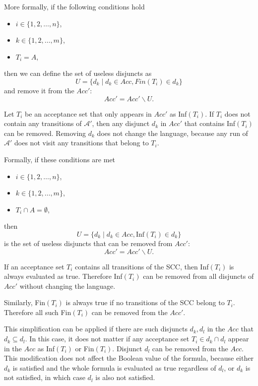 \documentclass[
  digital, %
  twoside, %
  table,   %
  lof,     %
  lot,     %
]{fithesis3}
\begin{document}
More formally, if the following conditions hold
\begin{itemize}
  \item $i \in \{1,2, \dots, n\}$,
  \item $k\in \{1,2, \dots, m\}$,
  \item $T_i = A$,
\end{itemize}
then we can define the set of useless disjuncts as
\begin{equation*}
  U = \{d_k \mid d_k \in Acc, Fin(T_i) \in d_k \}
\end{equation*}
and remove it from the $Acc'$:
\begin{equation*}
  Acc' = Acc' \smallsetminus U.
\end{equation*}

Let $T_i$ be an acceptance set that only appears in $Acc'$ as Inf$(T_i)$. If $T_i$ does not contain any transitions of $\mathcal{A'}$, then any disjunct $d_k$ in $Acc'$ that contains Inf$(T_i)$ can be removed. Removing $d_k$ does not change the language, because any run of $\mathcal{A'}$ does not visit any transitions that belong to $T_i$. 

Formally, if these conditions are met
\begin{itemize}
  \item $i \in \{1,2, \dots, n\}$,
  \item $k\in \{1,2, \dots, m\}$,
  \item $T_i \cap A = \emptyset$,
\end{itemize}
then 
\begin{equation*}
  U = \{d_k \mid d_k \in Acc, \text{Inf}(T_i) \in d_k \}
\end{equation*}
is the set of useless disjuncts that can be removed from $Acc'$:
\begin{equation*}
  Acc' = Acc' \smallsetminus U.
\end{equation*}

If an acceptance set $T_i$ contains all transitions of the SCC, then Inf$(T_i)$ is always evaluated as true. Therefore Inf$(T_i)$ can be removed from all disjuncts of $Acc'$ without changing the language. 

Similarly, Fin$(T_i)$ is always true if no transitions of the SCC belong to $T_i$. Therefore all such Fin$(T_i)$ can be removed from the $Acc'$.

This simplification can be applied if there are such disjuncts $d_k, d_l$ in the $Acc$ that $d_k \subseteq d_l$. In this case, it does not matter if any acceptance set $T_i \in d_k \cap d_l$ appear in the $Acc$ as Inf$(T_i)$ or Fin$(T_i)$. Disjunct $d_l$ can be removed from the $Acc$. This modification does not affect the Boolean value of the formula, because either $d_k$ is satisfied and the whole formula is evaluated as true regardless of $d_l$, or $d_k$ is not satisfied, in which case $d_l$ is also not satisfied. 
\end{document}
